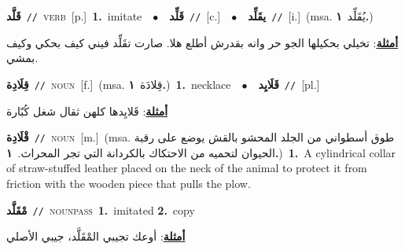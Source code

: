 \documentclass[10pt,a4paper,twoside]{article} %
\begin{document}
\begin{multicols}{2}
{\setlength\topsep{0pt}\textbf{\foreignlanguage{arabic}{قَلَّد}}\ {\color{gray}\texttt{//}\color{black}}\ \textsc{verb}\ [p.]\ \textbf{1.}~imitate\ \ $\bullet$\ \ \setlength\topsep{0pt}\textbf{\foreignlanguage{arabic}{قَلِّد}}\ {\color{gray}\texttt{//}\color{black}}\ [c.]\ \ $\bullet$\ \ \setlength\topsep{0pt}\textbf{\foreignlanguage{arabic}{يقَلِّد}}\ {\color{gray}\texttt{//}\color{black}}\ [i.]\ \color{gray}(msa. \foreignlanguage{arabic}{يُقَلِّد}~\foreignlanguage{arabic}{\textbf{١.}})\color{black}\  \begin{flushright}\color{gray}\foreignlanguage{arabic}{\textbf{\underline{\foreignlanguage{arabic}{أمثلة}}}: تخيلي بحكيلها الجو حر وانه بقدرش أطلع هلا. صارت تقَلِّد فيني كيف بحكي وكيف بمشي.}\end{flushright}\color{black}} \vspace{2mm}

{\setlength\topsep{0pt}\textbf{\foreignlanguage{arabic}{قِلَادِة}}\ {\color{gray}\texttt{//}\color{black}}\ \textsc{noun}\ [f.]\ \color{gray}(msa. \foreignlanguage{arabic}{قِلادَة}~\foreignlanguage{arabic}{\textbf{١.}})\color{black}\ \textbf{1.}~necklace\ \ $\bullet$\ \ \setlength\topsep{0pt}\textbf{\foreignlanguage{arabic}{قَلَايِد}}\ {\color{gray}\texttt{//}\color{black}}\ [pl.]\  \begin{flushright}\color{gray}\foreignlanguage{arabic}{\textbf{\underline{\foreignlanguage{arabic}{أمثلة}}}: قَلايِدها كلهن ثقال شغل كُبّارة}\end{flushright}\color{black}} \vspace{2mm}

{\setlength\topsep{0pt}\textbf{\foreignlanguage{arabic}{قْلَادِة}}\ {\color{gray}\texttt{//}\color{black}}\ \textsc{noun}\ [m.]\ \color{gray}(msa. \foreignlanguage{arabic}{طوق أسطواني من الجلد المحشو بالقش يوضع على رقبة الحيوان لتحميه من الاحتكاك بالكردانة التي تجر المحراث.}~\foreignlanguage{arabic}{\textbf{١.}})\color{black}\ \textbf{1.}~A cylindrical collar of straw-stuffed leather placed on the neck of the animal to protect it from friction with the wooden piece that pulls the plow.\ } \vspace{2mm}

{\setlength\topsep{0pt}\textbf{\foreignlanguage{arabic}{مْقَلَّد}}\ {\color{gray}\texttt{//}\color{black}}\ \textsc{noun\textunderscore pass}\ \textbf{1.}~imitated  \textbf{2.}~copy\  \begin{flushright}\color{gray}\foreignlanguage{arabic}{\textbf{\underline{\foreignlanguage{arabic}{أمثلة}}}: أوعك تجيبي المْقَلَّد، جيبي الأصلي}\end{flushright}\color{black}} \vspace{2mm}


\end{multicols}
\end{document}
